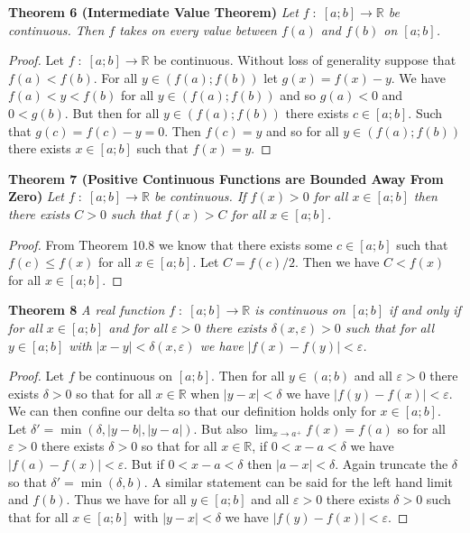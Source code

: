 \documentclass{article}
\begin{document}
\begin{flushleft}
\textbf{Theorem 6 (Intermediate Value Theorem)}
\textsl{Let $f \; : \; [a;b] \rightarrow \mathbb{R}$ be continuous. Then $f$ takes on every value between $f(a)$ and $f(b)$ on $[a;b]$.}
\begin{proof}
Let $f \; : \; [a;b] \rightarrow \mathbb{R}$ be continuous. Without loss of generality suppose that $f(a)<f(b)$. For all $y \in (f(a);f(b))$ let $g(x)=f(x)-y$. We have $f(a) < y < f(b)$ for all $y \in (f(a);f(b))$ and so $g(a) < 0$ and $0 < g(b)$. But then for all $y \in (f(a);f(b))$ there exists $c \in [a;b]$. Such that $g(c)=f(c)-y=0$. Then $f(c)=y$ and so for all $y \in (f(a);f(b))$ there exists $x \in [a;b]$ such that $f(x)=y$.
\end{proof}

\textbf{Theorem 7 (Positive Continuous Functions are Bounded Away From Zero)}
\textsl{Let $f \; : \; [a;b] \rightarrow \mathbb{R}$ be continuous. If $f(x) > 0$ for all $x \in [a;b]$  then there exists $C > 0$ such that $f(x) > C$ for all $x \in [a;b]$.}
\begin{proof}
From Theorem 10.8 we know that there exists some $c \in [a;b]$ such that $f(c) \leq f(x)$ for all $x \in [a;b]$. Let $C = f(c)/2$. Then we have $C < f(x)$ for all $x \in [a;b]$.
\end{proof}

\textbf{Theorem 8}
\textsl{A real function $f \; : \; [a;b] \rightarrow \mathbb{R}$ is continuous on $[a;b]$ if and only if for all $x \in [a;b]$ and for all $\varepsilon > 0$ there exists $\delta(x, \varepsilon) > 0$ such that for all $y \in [a;b]$ with $|x-y| < \delta(x, \varepsilon)$ we have $|f(x)-f(y)| < \varepsilon$.}
\begin{proof}
Let $f$ be continuous on $[a;b]$. Then for all $y \in (a;b)$ and all $\varepsilon > 0$ there exists $\delta > 0$ so that for all $x \in \mathbb{R}$ when $|y-x| < \delta$ we have $|f(y) - f(x)| < \varepsilon$. We can then confine our delta so that our definition holds only for $x \in [a;b]$. Let $\delta' = \min (\delta, |y-b|, |y-a|)$. But also $\lim_{x \rightarrow a^+} f(x) = f(a)$ so for all $\varepsilon > 0$ there exists $\delta > 0$ so that for all $x \in \mathbb{R}$, if $0 < x - a < \delta$ we have $|f(a) - f(x)| < \varepsilon$. But if $0 < x-a < \delta$ then $|a-x| < \delta$. Again truncate the $\delta$ so that $\delta' = \min (\delta, b)$. A similar statement can be said for the left hand limit and $f(b)$. Thus we have for all $y \in [a;b]$ and all $\varepsilon > 0$ there exists $\delta > 0$ such that for all $x \in [a;b]$ with $|y-x| < \delta$ we have $|f(y)-f(x)| < \varepsilon$.\newline


\end{proof}
\end{flushleft}
\end{document}

